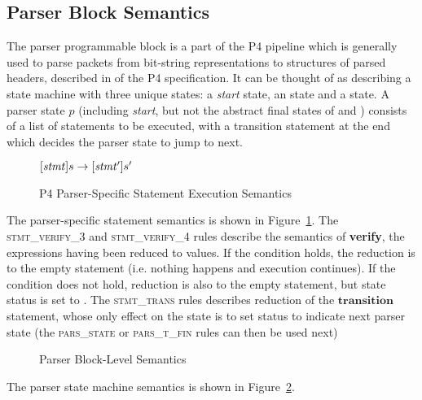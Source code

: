 \documentclass[UTF8]{article}
\begin{document}
\newpage
\newcommand{\start}{\textit{start}}
\subsection{Parser Block Semantics}
The parser programmable block is a part of the P4 pipeline which is generally used to parse packets from bit-string representations to structures of parsed headers, described in  of the P4 specification. It can be thought of as describing a state machine with three unique states: a \start{} state, an \accept{} state and a \reject{} state. A parser state $p$ (including \start{}, but not the abstract final states of \accept{} and \reject{}) consists of a list of statements to be executed, with a transition statement at the end which decides the parser state to jump to next.

\begin{figure}[ht!]
\begin{ottdefnblock}{$[  \mathit{stmt}  ]  s  \rightarrow  [  \mathit{stmt'}  ]  s'$}{}
\ottusedrule{\ottdrulestmtXXverifyXXThree{}}
\ottusedrule{\ottdrulestmtXXverifyXXFour{}}
\ottusedrule{\ottdrulestmtXXtrans{}}
\end{ottdefnblock}
\caption{P4 Parser-Specific Statement Execution Semantics}
\label{fig:parssemstmtexec}
\end{figure}

The parser-specific statement semantics is shown in Figure~\ref{fig:parssemstmtexec}. The \textsc{stmt\_verify\_3} and \textsc{stmt\_verify\_4} rules describe the semantics of \textbf{verify}, the expressions having been reduced to values. If the condition holds, the reduction is to the empty statement (i.e. nothing happens and execution continues). If the condition does not hold, reduction is also to the empty statement, but state status is set to \reject{}. The \textsc{stmt\_trans} rules describes reduction of the $\mathbf{transition}$ statement, whose only effect on the state is to set status to indicate next parser state (the \textsc{pars\_state} or \textsc{pars\_t\_fin} rules can then be used next)

\begin{figure}[ht!]
\ottdefnsparsXXsem
\caption{Parser Block-Level Semantics}
\label{fig:semparsexec}
\end{figure}

The parser state machine semantics is shown in Figure~\ref{fig:semparsexec}.
\end{document}

